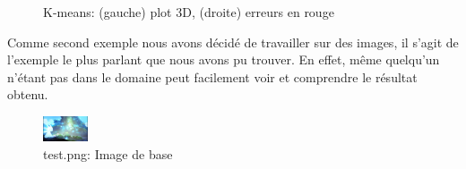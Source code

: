 \documentclass{article}
\begin{document}
  \begin{figure}[h]
    \centering
    \qquad
    \caption{K-means: (gauche) plot 3D, (droite) erreurs en rouge}%
    \label{fig:kmeans-iris}
  \end{figure}


  Comme second exemple nous avons décidé de travailler sur des images, il s'agit
  de l'exemple le plus parlant que nous avons pu trouver. En effet, même quelqu'un
  n'étant pas dans le domaine peut facilement voir et comprendre le résultat obtenu.



  \begin{figure}[h]
    \centering
    \includegraphics[scale=8]{images/test.png}
    \caption{test.png: Image de base}
    \label{fig:}
  \end{figure}
\end{document}
